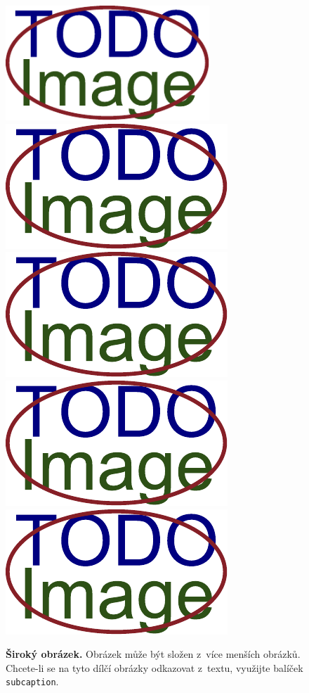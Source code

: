 \begin{figure}[h]\centering
  \centering
  \includegraphics[width=\linewidth,height=1.7in]{obrazky-figures/placeholder.pdf}\\[1pt]
  \includegraphics[width=0.24\linewidth]{obrazky-figures/placeholder.pdf}\hfill
  \includegraphics[width=0.24\linewidth]{obrazky-figures/placeholder.pdf}\hfill
  \includegraphics[width=0.24\linewidth]{obrazky-figures/placeholder.pdf}\hfill
  \includegraphics[width=0.24\linewidth]{obrazky-figures/placeholder.pdf}
  \caption{\textbf{Široký obrázek.} Obrázek může být složen z~více menších obrázků. Chcete-li se na tyto dílčí obrázky odkazovat z~textu, využijte balíček \texttt{subcaption}.}
  \label{sirokyObrazek}
\end{figure}



